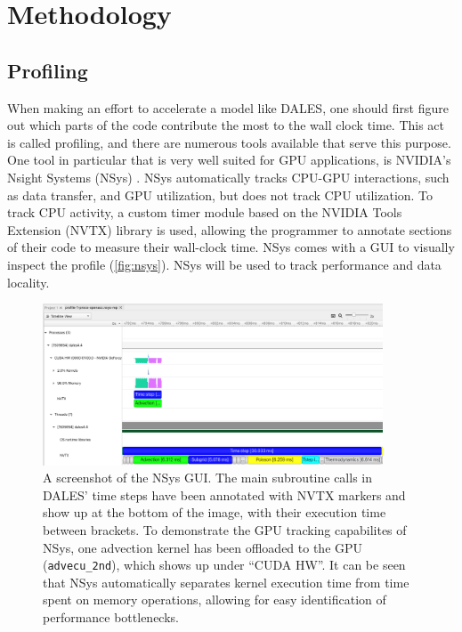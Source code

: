 \section{Methodology}

\subsection{Profiling}
When making an effort to accelerate a model like DALES, one should first figure out which parts of the code contribute the most to the wall clock time. This act is called profiling, and there are numerous tools available that serve this purpose. One tool in particular that is very well suited for GPU applications, is NVIDIA's Nsight Systems (NSys) \citep{nvidiaNVIDIANsightSystems}. NSys automatically tracks CPU-GPU interactions, such as data transfer, and GPU utilization, but does not track CPU utilization. To track CPU activity, a custom timer module based on the NVIDIA Tools Extension (NVTX) library is used, allowing the programmer to annotate sections of their code to measure their wall-clock time. NSys comes with a GUI to visually inspect the profile (\autoref{fig:nsys}). NSys will be used to track performance and data locality.

\begin{figure}[H]
    \centering
    \includegraphics[width=0.9\textwidth]{doc/images/profiles/nsys.png}
    \caption{A screenshot of the NSys GUI. The main subroutine calls in DALES' time steps have been annotated with NVTX markers and show up at the bottom of the image, with their execution time between brackets. To demonstrate the GPU tracking capabilites of NSys, one advection kernel has been offloaded to the GPU (\texttt{advecu\_2nd}), which shows up under ``CUDA HW''. It can be seen that NSys automatically separates kernel execution time from time spent on memory operations, allowing for easy identification of performance bottlenecks.}
    \label{fig:nsys}
\end{figure}

